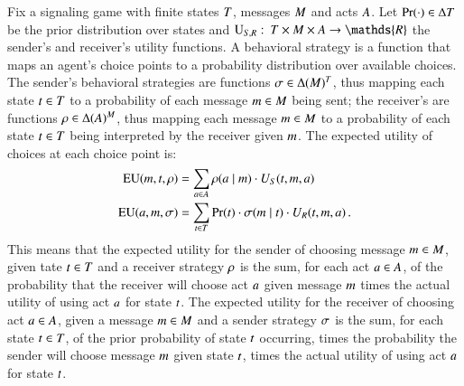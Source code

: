 \documentclass[fleqn,reqno,10pt]{article}
\begin{document}
Fix a signaling game with finite states $T$, messages $M$
and acts $A$. Let $\Pr(\cdot) \in \Delta{\ensuremath{T}}$ be the prior
distribution over states and $\Util_{\sen,\rec} \mycolon \States
\times \Messgs \times \Acts \rightarrow \mathds{R}$ the sender's and
receiver's utility functions. A behavioral strategy is a function that
maps an agent's choice points to a probability distribution over
available choices. The sender's behavioral strategies are functions
$\sigma \in \Delta(M)^T$, thus mapping each state $t \in T$ to a probability of each message $m \in M$ being sent; the receiver's are functions
$\rho \in \Delta(A)^M$, thus mapping each message $m \in M$ to a probability of each state $t \in T$ being interpreted by the receiver given $m$. The expected utility of choices
at each choice point is:
\begin{align*}
  \mathrm{EU}(m, t, \rho) & = \sum_{a \in A}
  \rho(a \mid m) \cdot U_S(t, m, a) \\
  \mathrm{EU}(a, m, \sigma) & = \sum_{t \in
    T} \Pr(t) \cdot \sigma(m \mid t) \cdot
  U_R(t, m, a) \,.
\end{align*}
This means that the expected utility for the sender of choosing message $m \in M$,
given tate $t \in T$ and a receiver strategy $\rho$ is the sum, for each act
$a \in A$, of the probability that the receiver will choose act $a$ given message
$m$ times the actual utility of using act $a$ for state $t$.  The expected utility
for the receiver of choosing act $a \in A$, given a message $m \in M$ and a
sender strategy $\sigma$ is the sum, for each state $t \in T$, of the prior
probability of state $t$ occurring, times the probability the sender will choose message
$m$ given state $t$, times the actual utility of using act $a$ for state $t$.
\end{document}
